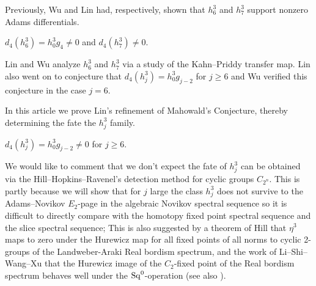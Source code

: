 Previously, Wu and Lin had, respectively, shown that $h_6^3$ and $h_7^3$ support nonzero Adams differentials.

\begin{thm}\label{thm: d4 h63}
  $d_4(h_6^3) = h_0^3 g_4 \neq 0$ and $d_4(h_7^3) \neq 0$.
\end{thm}

Lin and Wu analyze $h_6^3$ and $h_7^3$ via a study of the Kahn--Priddy transfer map.
Lin also went on to conjecture that $d_4(h_j^3) = h_0^3g_{j-2}$ for $j \geq 6$ \cite{Lin} and Wu verified this conjecture in the case $j=6$.

In this article we prove Lin's refinement of Mahowald's Conjecture, 
thereby determining the fate the $h_j^3$ family.



\begin{thm}\label{thm: d4 hj3} \label{thm:main}
  $d_4(h_j^3) = h_0^3 g_{j-2} \neq 0$
  for $j \geq 6$. %
\end{thm}

\begin{rmk}
We would like to comment that we don't expect the fate of $h_j^3$ can be obtained via the Hill--Hopkins--Ravenel's detection method for cyclic groups $C_{2^n}$. This is partly because we will show that for $j$ large the class $h_j^3$ does not survive to the Adams--Novikov $E_2$-page in the algebraic Novikov spectral sequence so it is difficult to directly compare with the homotopy fixed point spectral sequence and the slice spectral sequence; This is also suggested by a theorem of Hill \cite{Hill} that $\eta^3$ maps to zero under the Hurewicz map for all fixed points of all norms to cyclic 2-groups of the Landweber-Araki Real bordism spectrum, and the work of Li--Shi--Wang--Xu \cite{LSWX} that the Hurewicz image of the $C_2$-fixed point of the Real bordism spectrum behaves well under the $\operatorname{\mathrm{Sq}}^0$-operation (see also ).
\end{rmk}


